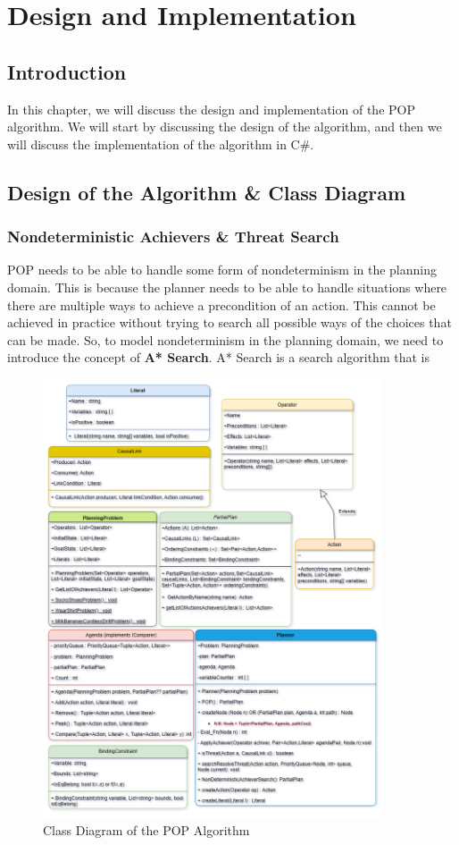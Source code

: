 \chapter{Design and Implementation}
\label{chap:design_and_implementation}


\section{Introduction}
In this chapter, we will discuss the design and implementation of the \ac{POP} algorithm.
We will start by discussing the design of the algorithm,
and then we will discuss the implementation of the algorithm in C\#.

\section{Design of the Algorithm \& Class Diagram}
\subsection{Nondeterministic Achievers \& Threat Search}
\acf{POP} needs to be able to handle some form of nondeterminism in the planning domain. This is because the planner needs
to be able to handle situations where there are multiple ways to achieve a precondition
of an action. This cannot be achieved in practice without trying to search all possible ways of the choices that can be made.
So, to model nondeterminism in the planning domain, we need to introduce the concept of \textbf{A* Search}.
A* Search is a search algorithm that is


\begin{figure}[ht]
    \centering
    \includegraphics[width=0.9\textwidth]{images/POP.png}
    \caption[Class Diagram of the POP Algorithm]{Class Diagram of the POP Algorithm}
    \label{fig:pop}
\end{figure}
